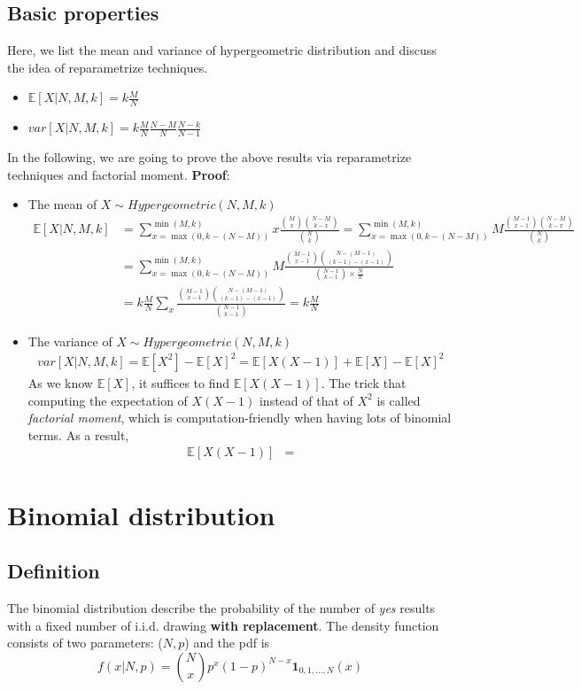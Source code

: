 \documentclass[11pt]{article}
\begin{document}
\subsection{Basic properties}
Here, we list the mean and variance of hypergeometric distribution and discuss the idea of reparametrize techniques.
\begin{itemize}
	\item $\mathbb{E}[X|N,M,k] = k\frac{M}{N}$
	\item $var[X|N,M,k]=k\frac{M}{N}\frac{N-M}{N}\frac{N-k}{N-1}$
\end{itemize}
In the following, we are going to prove the above results via reparametrize techniques and factorial moment.
{\bf Proof}:
\begin{itemize}
	\item The mean of $X\sim\textit{Hypergeometric}(N,M,k)$
	\begin{align*}
	\mathbb{E}[X|N,M,k] &= \sum_{x=\max(0,k-(N-M))}^{\min(M,k)} x \frac{{M\choose x}{N-M \choose k-x}}{{N\choose k}}= \sum_{x=\max(0,k-(N-M))}^{\min(M,k)} M \frac{{M-1\choose x-1}{N-M \choose k-x}}{{N\choose k}}\\
	&= \sum_{x=\max(0,k-(N-M))}^{\min(M,k)} M \frac{{M-1\choose x-1}{N-(M-1) \choose (k-1)-(x-1)}}{{N-1\choose k-1}\times\frac{N}{k}}\\
	&=k\frac{M}{N}\sum_{x}\frac{{M-1\choose x-1}{N-(M-1) \choose (k-1)-(x-1)}}{{N-1\choose k-1}}=k\frac{M}{N}
	\end{align*}
	\item The variance of $X\sim\textit{Hypergeometric}(N,M,k)$
	\begin{align*}
	var[X|N,M,k] = \mathbb{E}[X^2]-\mathbb{E}[X]^2 = \mathbb{E}[X(X-1)] + \mathbb{E}[X] - \mathbb{E}[X]^2
	\end{align*}
	As we know $\mathbb{E}[X]$, it suffices to find $\mathbb{E}[X(X-1)]$. The trick that computing the expectation of $X(X-1)$ instead of that of $X^2$ is called {\it factorial moment}, which is computation-friendly when having lots of binomial terms. As a result,
	\begin{align*}
	\mathbb{E}[X(X-1)] &= 
	\end{align*}
\end{itemize}

\section{Binomial distribution}
\subsection{Definition}
The binomial distribution describe the probability of the number of {\it yes} results with a fixed number of i.i.d. drawing {\bf with replacement}. The density function consists of two parameters: ($N,p$) and the pdf is
$$f(x|N,p) = {N\choose x}p^x(1-p)^{N-x}\mathbf{1}_{0,1,...,N}(x)$$
\end{document}
